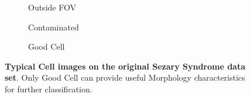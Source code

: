 \begin{figure}[ht]
\begin{center}
\begin{subfigure}[b]{0.33\textwidth}
			\caption{Outside FOV}
			\label{fig:Outside FOV}
		\end{subfigure}
		\begin{subfigure}[b]{0.33\textwidth}
			\caption{Contaminated}
			\label{fig:Contaminated}
		\end{subfigure}
		\begin{subfigure}[b]{0.33\textwidth}
			\caption{Good Cell}
			\label{fig:Good Cell}
		\end{subfigure}
	\end{center}
	\caption{\textbf{Typical Cell images on the original Sezary Syndrome data set}. Only Good Cell can provide useful Morphology characteristics for further classification.}
	\label{fig:lennas}
\end{figure}

